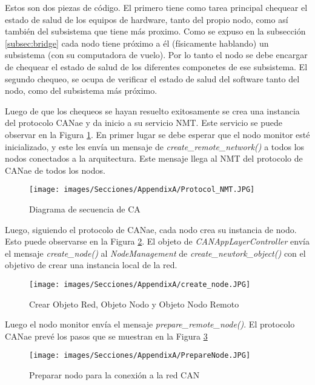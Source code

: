 Estos son dos piezas de código. El primero tiene como tarea principal
chequear el estado de salud de los equipos de hardware, tanto
del propio nodo, como así también del subsistema que tiene más proximo.
Como se expuso en la subsección \ref{subsec:bridge} cada nodo tiene
próximo a él (físicamente hablando) un subsistema (con su computadora
de vuelo). Por lo tanto el nodo se debe encargar de chequear el
estado de salud de los diferentes componetes de ese subsistema. El
segundo chequeo, se ocupa de verificar el estado de salud del software
tanto del nodo, como del subsistema más próximo.

Luego de que los chequeos se hayan resuelto exitosamente se crea una
instancia del protocolo CANae y da inicio a su servicio NMT. Este
servicio se puede observar en la Figura \ref{fig:NMTC5}. En primer lugar
se debe esperar que el nodo monitor esté inicializado, y este les
envía un mensaje de \textit{create\_remote\_network()} a todos los
nodos conectados a la arquitectura. Este mensaje llega al NMT del
protocolo de CANae de todos los nodos.

\begin{figure}[h!]
 \centering
 \texttt{[image: images/Secciones/AppendixA/Protocol\_NMT.JPG]}
  \caption{Diagrama de secuencia de CA}
\label{fig:NMTC5}
\end{figure}

Luego, siguiendo el protocolo de CANae, cada nodo crea su instancia de
nodo. Esto puede observarse en la Figura \ref{fig:CreateNodeNMTC5}.
El objeto de \textit{CANAppLayerController} envía el mensaje \textit{
  create\_node()} al \textit{NodeManagement} de \textit{create\_newtork\_object()} con el objetivo de crear una instancia local de la red.


\begin{figure}[h!]
 \centering
 \texttt{[image: images/Secciones/AppendixA/create\_node.JPG]}
  \caption{Crear Objeto Red, Objeto Nodo y Objeto Nodo Remoto}
  \label{fig:CreateNodeNMTC5}
\end{figure}

Luego el nodo monitor envía el mensaje \textit{prepare\_remote\_node()}.
El protocolo CANae prevé los pasos que se muestran en la Figura
\ref{fig:PrepareNodeC5}

\begin{figure}[h!]
 \centering
 \texttt{[image: images/Secciones/AppendixA/PrepareNode.JPG]}
  \caption{Preparar nodo para la conexión a la red CAN}
  \label{fig:PrepareNodeC5}
\end{figure}


